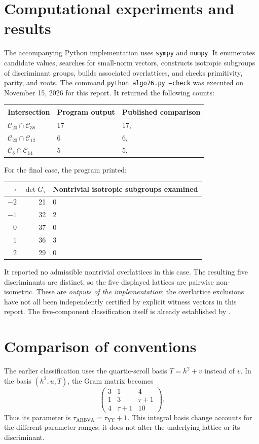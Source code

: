 \documentclass[11pt]{article}
\begin{document}
\section{Computational experiments and results}
The accompanying Python implementation uses \texttt{sympy} and \texttt{numpy}. It enumerates candidate values, searches for small-norm vectors, constructs isotropic subgroups of discriminant groups, builds associated overlattices, and checks primitivity, parity, and roots. The command \texttt{python algo76.py --check} was executed on November 15, 2026 for this report. It returned the following counts:
\begin{center}\begin{tabular}{lll}\toprule
Intersection & Program output & Published comparison\\\midrule
$\mathcal C_{20}\cap\mathcal C_{38}$ & 17 & 17, \cite[Theorem 7.9]{YangYu}\\
$\mathcal C_{20}\cap\mathcal C_{12}$ & 6 & 6, \cite[Theorem 7.11]{YangYu}\\
$\mathcal C_8\cap\mathcal C_{14}$ & 5 & 5, \cite[Theorem 4]{ABBVA}\\\bottomrule\end{tabular}\end{center}
For the final case, the program printed:
\begin{center}\begin{tabular}{rrl}\toprule
$\tau$ & $\det G_\tau$ & Nontrivial isotropic subgroups examined\\\midrule
$-2$&21&0\\$-1$&32&2\\$0$&37&0\\$1$&36&3\\$2$&29&0\\\bottomrule\end{tabular}\end{center}
It reported no admissible nontrivial overlattices in this case. The resulting five discriminants are distinct, so the five displayed lattices are pairwise non-isometric. These are \emph{outputs of the implementation}; the overlattice exclusions have not all been independently certified by explicit witness vectors in this report. The five-component classification itself is already established by \cite{ABBVA}.

\section{Comparison of conventions}
The earlier classification \cite{ABBVA} uses the quartic-scroll basis $T=h^2+v$ instead of $v$. In the basis $(h^2,u,T)$, the Gram matrix becomes
\[
\begin{pmatrix}3&1&4\\1&3&\tau+1\\4&\tau+1&10\end{pmatrix}.
\]
Thus its parameter is $\tau_{\mathrm{ABBVA}}=\tau_{\mathrm{YY}}+1$. This integral basis change accounts for the different parameter ranges; it does not alter the underlying lattice or its discriminant.
\end{document}
